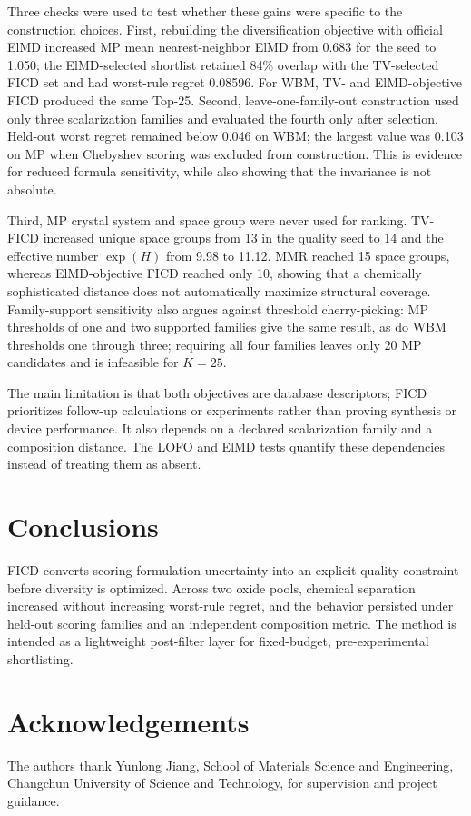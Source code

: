 \documentclass[final,5p,times,twocolumn]{elsarticle}
\begin{document}
Three checks were used to test whether these gains were specific to the construction choices. First, rebuilding the diversification objective with official ElMD increased MP mean nearest-neighbor ElMD from 0.683 for the seed to 1.050; the ElMD-selected shortlist retained 84\% overlap with the TV-selected FICD set and had worst-rule regret 0.08596. For WBM, TV- and ElMD-objective FICD produced the same Top-25. Second, leave-one-family-out construction used only three scalarization families and evaluated the fourth only after selection. Held-out worst regret remained below 0.046 on WBM; the largest value was 0.103 on MP when Chebyshev scoring was excluded from construction. This is evidence for reduced formula sensitivity, while also showing that the invariance is not absolute.

Third, MP crystal system and space group were never used for ranking. TV-FICD increased unique space groups from 13 in the quality seed to 14 and the effective number $\exp(H)$ from 9.98 to 11.12. MMR reached 15 space groups, whereas ElMD-objective FICD reached only 10, showing that a chemically sophisticated distance does not automatically maximize structural coverage. Family-support sensitivity also argues against threshold cherry-picking: MP thresholds of one and two supported families give the same result, as do WBM thresholds one through three; requiring all four families leaves only 20 MP candidates and is infeasible for $K=25$.

The main limitation is that both objectives are database descriptors; FICD prioritizes follow-up calculations or experiments rather than proving synthesis or device performance. It also depends on a declared scalarization family and a composition distance. The LOFO and ElMD tests quantify these dependencies instead of treating them as absent.

\section{Conclusions}
FICD converts scoring-formulation uncertainty into an explicit quality constraint before diversity is optimized. Across two oxide pools, chemical separation increased without increasing worst-rule regret, and the behavior persisted under held-out scoring families and an independent composition metric. The method is intended as a lightweight post-filter layer for fixed-budget, pre-experimental shortlisting.

\section*{Acknowledgements}
The authors thank Yunlong Jiang, School of Materials Science and Engineering, Changchun University of Science and Technology, for supervision and project guidance.
\end{document}
